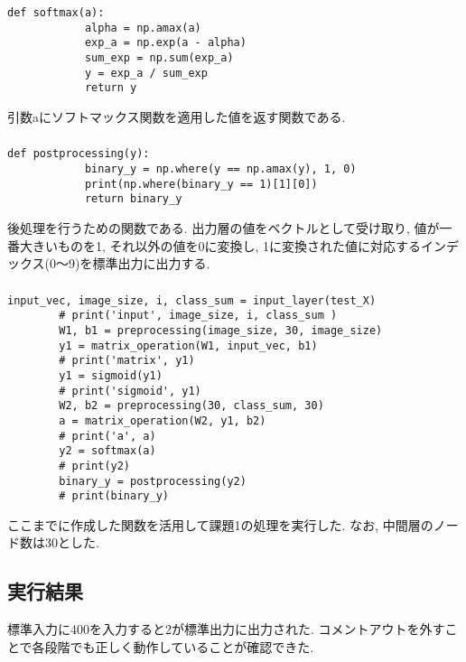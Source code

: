 \documentclass[a4j]{jarticle}
\begin{document}
    \subsubsection*{}
        \begin{lstlisting}[caption=ソフトマックス関数,label=fuga]
        def softmax(a):
            alpha = np.amax(a)
            exp_a = np.exp(a - alpha)
            sum_exp = np.sum(exp_a)
            y = exp_a / sum_exp
            return y
        \end{lstlisting}
        引数aにソフトマックス関数を適用した値を返す関数である.

    \subsubsection*{}
        \begin{lstlisting}[caption=後処理,label=fuga]
        def postprocessing(y):
            binary_y = np.where(y == np.amax(y), 1, 0)
            print(np.where(binary_y == 1)[1][0])
            return binary_y
        \end{lstlisting}
        後処理を行うための関数である.
        出力層の値をベクトルとして受け取り, 値が一番大きいものを1, それ以外の値を0に変換し, 1に変換された値に対応するインデックス(0～9)を標準出力に出力する.

    \subsubsection*{}
        \begin{lstlisting}[caption=課題1の実行,label=fuga]
        input_vec, image_size, i, class_sum = input_layer(test_X)
        # print('input', image_size, i, class_sum )
        W1, b1 = preprocessing(image_size, 30, image_size)
        y1 = matrix_operation(W1, input_vec, b1)
        # print('matrix', y1)
        y1 = sigmoid(y1)
        # print('sigmoid', y1)
        W2, b2 = preprocessing(30, class_sum, 30)
        a = matrix_operation(W2, y1, b2)
        # print('a', a)
        y2 = softmax(a)
        # print(y2)
        binary_y = postprocessing(y2)
        # print(binary_y)
        \end{lstlisting}
        ここまでに作成した関数を活用して課題1の処理を実行した.
        なお, 中間層のノード数は30とした.

\subsection*{実行結果}
    標準入力に400を入力すると2が標準出力に出力された.
    コメントアウトを外すことで各段階でも正しく動作していることが確認できた.
\end{document}
